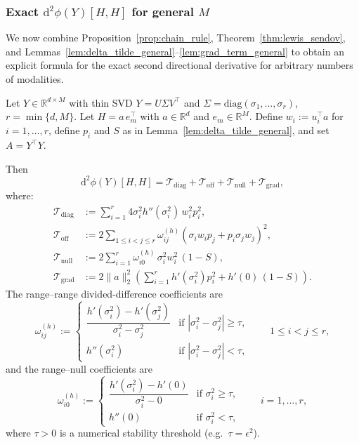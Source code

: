 \subsubsection{Exact $\mathrm{d}^2\phi(Y)[H,H]$ for general $M$}

We now combine Proposition~\ref{prop:chain_rule}, Theorem~\ref{thm:lewis_sendov}, and Lemmas~\ref{lem:delta_tilde_general}--\ref{lem:grad_term_general} to obtain an explicit formula for the exact second directional derivative for arbitrary numbers of modalities.

\begin{theorem}
\label{thm:exact_d2phi_general}
Let $Y \in \mathbb{R}^{d \times M}$ with thin SVD $Y = U \Sigma V^\top$ and $\Sigma=\mathrm{diag}(\sigma_1,\ldots,\sigma_r)$, $r=\min\{d,M\}$. Let $H = a \, e_m^\top$ with $a \in \mathbb{R}^d$ and $e_m\in\mathbb{R}^M$. Define $w_i:=u_i^\top a$ for $i=1,\ldots,r$, define $p_i$ and $S$ as in Lemma~\ref{lem:delta_tilde_general}, and set $A=Y^\top Y$.

Then
\begin{equation}
\mathrm{d}^2 \phi(Y)[H, H] = \mathcal{T}_{\mathrm{diag}} + \mathcal{T}_{\mathrm{off}} + \mathcal{T}_{\mathrm{null}} + \mathcal{T}_{\mathrm{grad}},
\label{eq:d2phi_general_decomp}
\end{equation}
where:
\begin{align}
\mathcal{T}_{\mathrm{diag}}
&:= \sum_{i=1}^{r} 4 \sigma_i^2 h''(\sigma_i^2)\, w_i^2 p_i^2, \label{eq:Tdiag_general}\\[3pt]
\mathcal{T}_{\mathrm{off}}
&:= 2 \sum_{1\leq i<j\leq r} \omega_{ij}^{(h)} \left(\sigma_i w_i p_j + p_i \sigma_j w_j\right)^2, \label{eq:Toff_general}\\[3pt]
\mathcal{T}_{\mathrm{null}}
&:= 2 \sum_{i=1}^{r} \omega_{i0}^{(h)} \,\sigma_i^2 w_i^2\,(1-S), \label{eq:Tnull_general}\\[3pt]
\mathcal{T}_{\mathrm{grad}}
&:= 2 \|a\|_2^2\left( \sum_{i=1}^{r} h'(\sigma_i^2) p_i^2 + h'(0)\,(1-S) \right). \label{eq:Tgrad_general}
\end{align}
The range--range divided-difference coefficients are
\begin{equation}
\omega_{ij}^{(h)} := \begin{cases}
\dfrac{h'(\sigma_i^2) - h'(\sigma_j^2)}{\sigma_i^2 - \sigma_j^2} & \text{if } |\sigma_i^2-\sigma_j^2|\geq \tau, \\[10pt]
h''(\sigma_i^2) & \text{if } |\sigma_i^2-\sigma_j^2|<\tau,
\end{cases}
\qquad 1\leq i<j\leq r,
\label{eq:omega_ij_general}
\end{equation}
and the range--null coefficients are
\begin{equation}
\omega_{i0}^{(h)} := \begin{cases}
\dfrac{h'(\sigma_i^2) - h'(0)}{\sigma_i^2 - 0} & \text{if } \sigma_i^2 \geq \tau, \\[10pt]
h''(0) & \text{if } \sigma_i^2<\tau,
\end{cases}
\qquad i=1,\ldots,r,
\label{eq:omega_i0_general}
\end{equation}
where $\tau>0$ is a numerical stability threshold (e.g.\ $\tau=\epsilon^2$).
\end{theorem}
